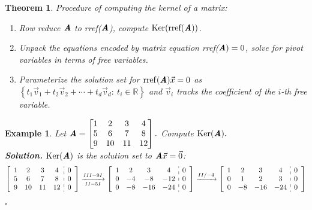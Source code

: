 \documentclass[12pt, a4paper]{article}
\newtheorem{thm}{Theorem}[subsection]
\newtheorem{eg}{Example}[subsection]
\newenvironment*{sol}{\indent\textbf{Solution. }}{\hfill{$\square$}\par}
\def\R{{\mathbb{R}}}
\def\rref{\mathrm{rref}}
\def\Ker{\mathrm{Ker}}
\def\vecx{\vec{x}}
\def\vecv{\vec{v}}
\def\matrixA{\textbf{\emph{A}}}
\begin{document}
\begin{thm}\label{thm3.3.4}
	Procedure of computing the kernel of a matrix:
	\begin{enumerate}
		\item Row reduce $\matrixA$ to rref($\matrixA$), compute $\Ker(\text{rref}(\matrixA))$.
		\item Unpack the equations encoded by matrix equation rref($\matrixA)=0$, solve for pivot variables in terms of free variables.
		\item Parameterize the solution set for $\rref(\matrixA)\vecx=0$ as $\left\{t_1\vecv_1+t_2\vecv_2+\cdots+t_d\vecv_d:\ t_i\in\R\right\}$ and $\vecv_i$ tracks the coefficient of the $i$-th free variable.
	\end{enumerate}
\end{thm}
\begin{eg}
	Let $\matrixA=\begin{bmatrix}1&2&3&4\\5&6&7&8\\9&10&11&12\end{bmatrix}.$  Compute $\Ker(\matrixA).$\\
	\begin{sol}
		$\Ker(\matrixA)$ is the solution set to $\matrixA\vecx=\vec{0}$: 
		$$\begin{aligned}
			\left[\begin{array}{c:c}\begin{matrix}1&2&3&4\\5&6&7&8\\9&10&11&12\end{matrix}&\begin{matrix}0\\0\\0\end{matrix}\end{array}\right]\xrightarrow[II-5I]{III-9I}\left[\begin{array}{c:c}\begin{matrix}1&2&3&4\\0&-4&-8&-12\\0&-8&-16&-24\end{matrix}&\begin{matrix}0\\0\\0\end{matrix}\end{array}\right]&\xrightarrow[]{II/-4}\left[\begin{array}{c:c}\begin{matrix}1&2&3&4\\0&1&2&3\\0&-8&-16&-24\end{matrix}&\begin{matrix}0\\0\\0\end{matrix}\end{array}\right]\\

\end{aligned}$$
\end{sol}
\end{eg}
\end{document}
